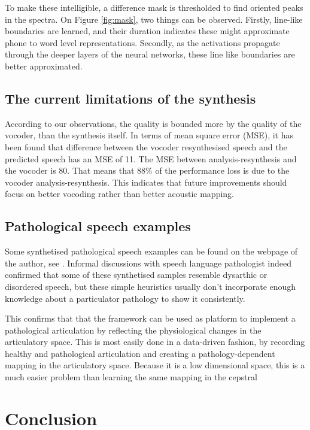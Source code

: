 \documentclass[a4paper]{article}
\begin{document}
To make these intelligible, a difference mask is thresholded to find oriented peaks in the spectra.
On Figure \ref{fig:mask}, two things can be observed. Firstly, line-like boundaries are learned, and their duration indicates these might approximate phone to word level representations. Secondly, as the activations propagate through the deeper layers of the neural networks, these line like boundaries are better approximated.

\subsection{The current limitations of the synthesis} \label{section:limitations}
According to our observations, the quality is bounded more by the
quality of the vocoder, than the synthesis itself. In terms of mean square
error (MSE), it has been found that difference between the vocoder resynthesised speech
and the predicted speech has an MSE of 11. The MSE
between analysis-resynthesis and the vocoder is 80. That means that 88\% of the performance loss
is due to the vocoder analysis-resynthesis. This indicates that
future improvements should focus on better vocoding rather than better
acoustic mapping.


\subsection{Pathological speech examples}

Some synthetised pathological speech examples can be found on the webpage of the
author, see \cite{Speech2019}.
Informal discussions with speech language pathologist indeed confirmed
that some of these synthetised samples resemble dysarthic or disordered speech,
but these simple heuristics usually don't incorporate enough knowledge
about a particulator pathology to show it consistently.

This confirms that that the framework can be used as platform to implement a
pathological articulation by reflecting the physiological changes in the articulatory
space. This is most easily done in a data-driven fashion, by recording healthy
and pathological articulation and creating a pathology-dependent mapping
in the articulatory space. Because it is a low dimensional space, this
is a much easier problem than learning the same mapping in the cepstral

\section{Conclusion}
\end{document}

